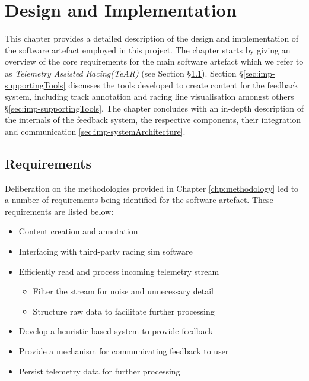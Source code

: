 \def \methodname {TeAR\xspace}
\def \methodnamefull {Telemetry Assisted Racing\xspace}

\chapter{Design and Implementation}
This chapter provides a detailed description of the design and implementation of the software artefact employed in this project. The chapter starts by giving an overview of the core requirements for the main software artefact which we refer to as \emph{\methodnamefull (\methodname)} (see Section \S\ref{sec:imp-requirements}). Section \S\ref{sec:imp-supportingTools} discusses the tools developed to create content for the feedback system, including track annotation and racing line visualisation amongst others \S\ref{sec:imp-supportingTools}. The chapter concludes with an in-depth description of the internals of the feedback system, the respective components, their integration and communication \ref{sec:imp-systemArchitecture}.

\section{Requirements}
\label{sec:imp-requirements}
Deliberation on the methodologies provided in Chapter \ref{chp:methodology} led to a number of requirements being identified for the software artefact. These requirements are listed below:

\begin{itemize}
	\item Content creation and annotation 
	\item Interfacing with third-party racing sim software 
	\item Efficiently read and process incoming telemetry stream
	\begin{itemize}
		\item Filter the stream for noise and unnecessary detail
		\item Structure raw data to facilitate further processing
	\end{itemize}
	\item Develop a heuristic-based system to provide feedback
	\item Provide a mechanism for communicating feedback to user
	\item Persist telemetry data for further processing
\end{itemize}

